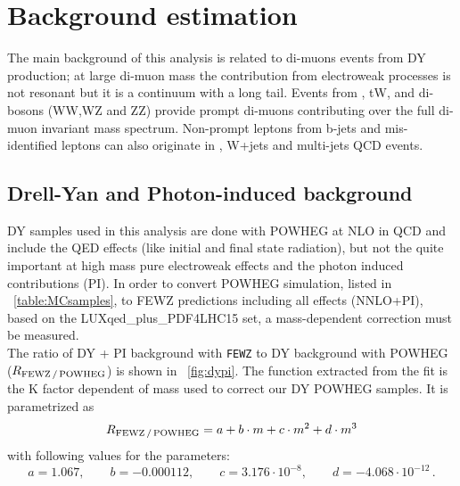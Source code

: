 \section{Background estimation}
The main background of this analysis is related to di-muons events from DY production; at large di-muon mass the contribution from electroweak processes is not resonant but it is a continuum with a long tail. Events from \ttbar, tW, and di-bosons (WW,WZ and ZZ) provide prompt di-muons contributing over the full di-muon invariant mass spectrum. Non-prompt leptons from b-jets and mis-identified leptons can also originate in \ttbar, W+jets and multi-jets QCD events.

\subsection{Drell-Yan and Photon-induced background}
\label{sec:DYandPI}
DY samples used in this analysis are done with POWHEG at NLO in QCD and include the QED effects (like initial and final state radiation), but not the quite important at high mass pure electroweak effects and the photon induced contributions (PI). In order to convert POWHEG simulation, listed in \tablename~\ref{table:MCsamples}, to FEWZ predictions including all effects (NNLO+PI), based on the LUXqed\_plus\_PDF4LHC15 set, a mass-dependent correction must be measured. \\
The ratio of DY + PI background with \mbox{{\tt FEWZ}} to
DY background with POWHEG ($R_{\rm FEWZ\,/\,POWHEG}$) is shown in \figurename~\ref{fig:dypi}. The function extracted from the fit is the K factor dependent of mass used to correct our DY POWHEG samples. It is parametrized as
\begin{equation}
R_{\rm FEWZ\,/\,POWHEG} = a + b\cdot m  + c\cdot m^2 + d\cdot m^3
\end{equation}
with following values for the parameters:
\begin{equation*}
a = 1.067, \qquad b = -0.000112, \qquad c = 3.176\cdot 10^{-8}, \qquad d = -4.068\cdot 10^{-12}\,.
\end{equation*}

